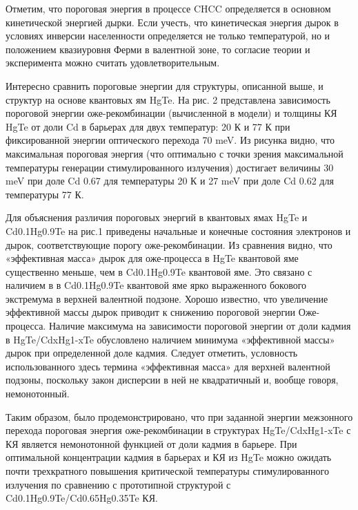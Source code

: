     Отметим, что пороговая энергия в процессе CHCC определяется в основном кинетической энергией дырки. Если учесть, что кинетическая
    энергия дырок в условиях инверсии населенности определяется не только температурой, но и положением квазиуровня Ферми в валентной 
    зоне, то согласие теории и эксперимента можно считать удовлетворительным.

    Интересно сравнить пороговые энергии для структуры, описанной выше, и структур на основе квантовых ям HgTe. На рис. 2 представлена 
    зависимость пороговой энергии оже-рекомбинации (вычисленной в модели) и толщины КЯ HgTe от доли Cd в барьерах для двух температур: 
    20 К и 77 К при фиксированной энергии оптического перехода 70 meV. Из рисунка видно, что максимальная пороговая энергия (что оптимально 
    с точки зрения максимальной температуры генерации стимулированного излучения) достигает величины 30 meV при доле Cd 0.67 для температуры 
    20 К и 27 meV при доле Cd 0.62 для температуры 77 К.

    Для объяснения различия пороговых энергий в квантовых ямах HgTe и Cd0.1Hg0.9Te на рис.1 приведены начальные и конечные состояния электронов 
    и дырок, соответствующие порогу оже-рекомбинации. Из сравнения видно, что «эффективная масса» дырок для оже-процесса в HgTe квантовой яме 
    существенно меньше, чем в Cd0.1Hg0.9Te квантовой яме. Это связано с наличием в в Cd0.1Hg0.9Te квантовой яме ярко выраженного бокового 
    экстремума в верхней валентной подзоне. Хорошо известно, что увеличение эффективной массы дырок приводит к снижению пороговой энергии 
    Оже-процесса. Наличие максимума на зависимости пороговой энергии от доли кадмия в HgTe/CdxHg1-xTe обусловлено наличием минимума 
    «эффективной массы» дырок при определенной доле кадмия. Следует отметить, условность использованного здесь термина «эффективная масса» 
    для верхней валентной подзоны, поскольку закон дисперсии в ней не квадратичный и, вообще говоря, немонотонный.

    Таким образом, было продемонстрировано, что при заданной энергии межзонного перехода пороговая энергия оже-рекомбинации в структурах 
    HgTe/CdxHg1-xTe с КЯ является немонотонной функцией от доли кадмия в барьере. При оптимальной концентрации кадмия в барьерах и КЯ из HgTe 
    можно ожидать почти трехкратного повышения критической температуры стимулированного излучения по сравнению с прототипной структурой с 
    Cd0.1Hg0.9Te/Cd0.65Hg0.35Te КЯ.

    \newpage
